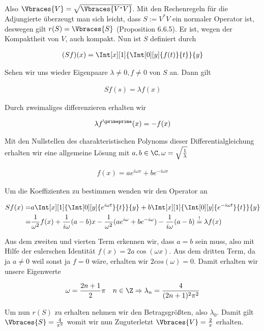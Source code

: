 \begin{solution}
Also $\Vbraces{V} = \sqrt{\Vbraces{V^*V}}$. Mit den Rechenregeln für die Adjungierte
überzeugt man sich leicht, dass $S:=V^*V$ ein normaler Operator ist, deswegen gilt
$r(S) = \Vbraces{S}$ (Proposition 6.6.5). Er ist, wegen der
Kompaktheit von $V$, auch kompakt. Nun ist $S$ definiert durch

\begin{align*}
  (Sf)(x)
  =
  \Int[x][1]{
    \Int[0][y]{f(t)}{t}
  }{y}
\end{align*}

Sehen wir uns wieder Eigenpaare $\lambda \neq 0, f \neq 0$ von $S$ an. Dann gilt

\begin{align*}
  Sf(s) = \lambda f(x)
\end{align*}

Durch zweimaliges differenzieren erhalten wir

\begin{align*}
  \lambda f^\primeprime(x) = -f(x)
\end{align*}

Mit den Nullstellen des charakteristischen Polynoms dieser Differentialgleichung
erhalten wir eine allgemeine Lösung mit $a,b \in \C, \omega = \sqrt{\frac{1}{\lambda}}$

\begin{align*}
  f(x) = a e^{i\omega x} + b e^{-i \omega x}
\end{align*}

Um die Koeffizienten zu bestimmen wenden wir den Operator an

\begin{align*}
  Sf(x)
  =&
  a \Int[x][1]{
    \Int[0][y]{e^{i\omega t}}{t}
  }{y}
  +
  b \Int[x][1]{
      \Int[0][y]{e^{-i\omega t}}{t}
  }{y} \\
  =&
  \frac{1}{\omega^2} f(x)
  +
  \frac{1}{i\omega} (a-b)x
  -
  \frac{1}{\omega^2}(ae^{i\omega} + be^{-i\omega})
  -
  \frac{1}{i\omega}(a-b)
  \stackrel{!}{=}
  \lambda f(x)
\end{align*}

Aus dem zweiten und vierten Term erkennen wir, dass $a=b$ sein muss, also mit
Hilfe der eulerschen Identität $f(x) = 2a \cos(\omega x)$. Aus dem dritten Term,
da ja $a \neq 0$ weil sonst ja $f = 0$ wäre, erhalten wir $2cos(\omega) = 0$. Damit
erhalten wir unsere Eigenwerte

\begin{align*}
  \omega
  =
  \frac{2n+1}{2} \pi     \quad n \in \Z
  \Rightarrow
  \lambda_n
  =
  \frac{4}{(2n+1)^2 \pi^2}
\end{align*}

Um nun $r(S)$ zu erhalten nehmen wir den Betragsgrößten, also $\lambda_0$.
Damit gilt $\Vbraces{S} = \frac{4}{\pi^2}$ womit wir nun Zuguterletzt
$\Vbraces{V} = \frac{2}{\pi}$ erhalten.
\end{solution}
